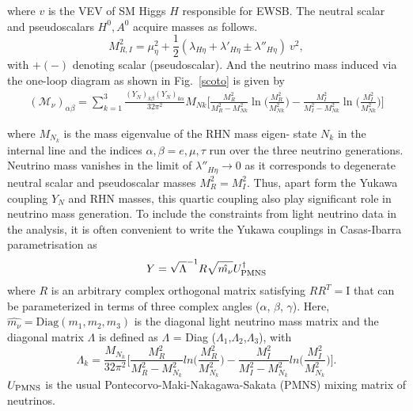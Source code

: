 \documentclass[prd,nofootinbib,preprint,superscriptaddress]{revtex4}
\begin{document}
where $v$ is the VEV of SM Higgs $H$ responsible for EWSB.
The neutral scalar and pseudoscalars $H^0, A^0$ acquire masses as follows.
\begin{equation}
M^2_{R,I}=\mu^2_\eta+\frac{1}{2}(\lambda_{H \eta}+\lambda'_{H \eta}\pm \lambda''_{H \eta})~v^2,
\end{equation}
with $+ (-)$ denoting scalar (pseudoscalar). And the neutrino mass induced via the one-loop diagram as shown in Fig.~\ref{scoto} is given by
\begin{eqnarray}
(\mathcal{M}_\nu)_{\alpha \beta}=\sum_{k=1}^{3} \frac{(Y_{N})_{k \beta} (Y_{N})_{k \alpha}}{32 \pi^2} M_{Nk}\bigg[\frac{M^2_R}{M^2_R-M^2_{Nk}}\ln \bigg(\frac{M^2_R}{M^2_{Nk}}\bigg)-\frac{M^2_I}{M^2_I-M^2_{Nk}}\ln \bigg(\frac{M^2_I}{M^2_{Nk}}\bigg)\bigg]
\end{eqnarray}

where $M_{N_k}$ is the mass eigenvalue of the RHN mass eigen-
state $N_k$ in the internal line and the indices $\alpha, \beta = e, \mu, \tau$
run over the three neutrino generations.
Neutrino
mass vanishes in the limit of $\lambda''_{H \eta} \to 0$ as it corresponds to degenerate neutral scalar and pseudoscalar masses $M^2_R=M^2_I$. Thus, apart form the Yukawa coupling $Y_N$ and RHN masses, this quartic coupling also play significant role in neutrino mass generation. To include the constraints from light neutrino data in the analysis, it is often convenient to write the Yukawa couplings in Casas-Ibarra parametrisation \cite{Casas:2001sr,Toma:2013zsa} as
\begin{equation}
Y = {\sqrt{\Lambda}}^{-1} R \sqrt{\hat{m_\nu}} U^\dagger_{\rm PMNS} 
\end{equation}
where $R$ is an arbitrary complex orthogonal matrix satisfying $RR^{T}=\mathrm{I}$ that can be parameterized in terms of three complex angles ($\alpha$, $\beta$, $\gamma$). Here, $\hat{m_\nu} =  \textrm{Diag}(m_1,m_2,m_3)$ is the diagonal light neutrino mass matrix and the diagonal matrix $\Lambda$ is defined as $\Lambda$ = Diag ($\Lambda_1$,$\Lambda_2$,$\Lambda_3$), with
\begin{equation}
\Lambda_k=\frac{M_{N_k}}{32 \pi^2} \bigg[\frac{M^2_R}{M^2_R-M^2_{N_k}}ln \bigg(\frac{M^2_R}{M^2_{N_k}}\bigg)-\frac{M^2_I}{M^2_I-M^2_{N_k}}ln \bigg(\frac{M^2_I}{M^2_{N_k}}\bigg)\bigg].
\end{equation}
$U_{\rm PMNS}$ is the usual Pontecorvo-Maki-Nakagawa-Sakata (PMNS) mixing matrix of neutrinos. 
\end{document}
